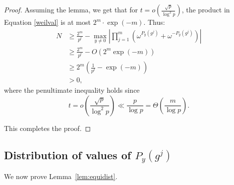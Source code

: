 \documentclass{article}
\begin{document}
\begin{proof}
Assuming the lemma, we get that for $t = o\left(\frac{\sqrt{p}}{\log^2 p}\right)$, the product in Equation \eqref{weilval} is at most $2^m \cdot \exp(-m)$.
Thus:
\begin{align*} N &\geq \frac{2^m}{p^t}  - \max_{y \neq 0} \left| \prod_{j=1}^m \left(\omega^{P_y(g^{j})} + \omega^{-P_y(g^{j})} \right) \right|\\
 &\geq \frac{2^m}{p^t}  - O(2^{m} \exp(-m))\\
 &\geq 2^m \left(\frac{1}{p^t} - \exp(-m)  \right)\\
 & > 0,
\end{align*}
where the penultimate inequality holds since
$$t = o\left( \frac{\sqrt{p}}{\log^2 p} \right) \ll \frac{p}{\log p} = \Theta\left( \frac{m}{\log p} \right).$$

This completes the proof.
\end{proof}


\subsection{Distribution of values of $P_y(g^j)$}

We now prove Lemma~\ref{lem:equidist}.
\end{document}
